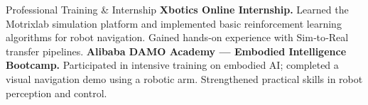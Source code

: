 \begin{rubric}{Professional Training \& Internship}
\entry*[Spring 2026]%
	\textbf{Xbotics Online Internship.}
	Learned the Motrixlab simulation platform and implemented basic reinforcement learning algorithms for robot navigation. Gained hands‑on experience with Sim‑to‑Real transfer pipelines.
%
\entry*[2026]%
	\textbf{Alibaba DAMO Academy — Embodied Intelligence Bootcamp.}
	Participated in intensive training on embodied AI; completed a visual navigation demo using a robotic arm. Strengthened practical skills in robot perception and control.
\end{rubric}
